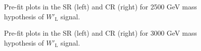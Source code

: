 \begin{figure}[H]
  \centering
  \caption{Pre-fit plots in the SR (left) and CR (right) for 2500 GeV mass hypothesis of $W'_{\text{L}}$ signal.}
  \label{fig:Prefit_WpLH2500_Asimov}
\end{figure}
\begin{figure}[H]
  \centering
  \caption{Pre-fit plots in the SR (left) and CR (right) for 3000 GeV mass hypothesis of $W'_{\text{L}}$ signal.}
  \label{fig:Prefit_WpLH3000_Asimov}
\end{figure}
